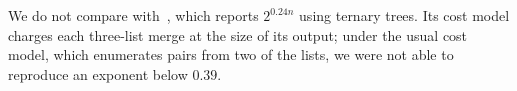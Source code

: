We do not compare with~\cite{Li25}, which reports $2^{0.24n}$ using ternary trees. Its cost model charges each
three-list merge at the size of its output; under the usual cost model, which enumerates pairs from two of the lists,
we were not able to reproduce an exponent below $0.39$.
